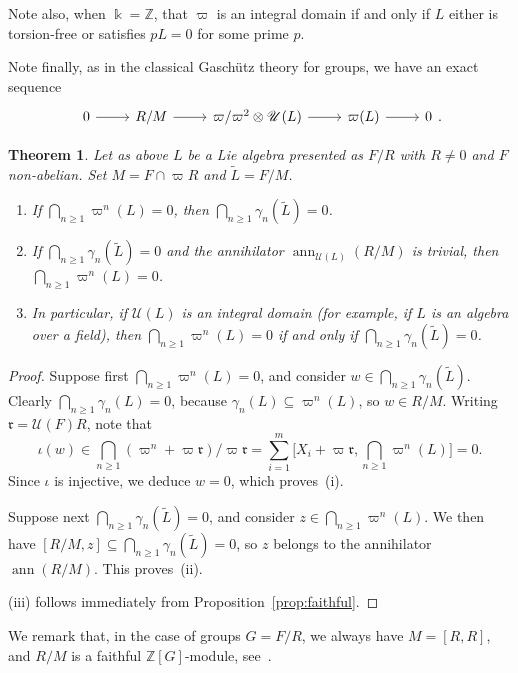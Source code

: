 \documentclass[a4paper,reqno,notitlepage]{amsart}
\newtheorem{theorem}{Theorem}[section]
\theoremstyle{definition}
\newcommand{\Z}{\mathbb Z}
\newcommand\rr{{\mathfrak r}}
\newcommand\U{\mathscr U}
\begin{document}
Note also, when $\Bbbk=\Z$, that $\varpi$ is an integral domain if and
only if $L$ either is torsion-free or satisfies $pL=0$ for some prime
$p$.

Note finally, as in the classical Gasch\"utz theory for groups, we
have an exact sequence
\[\begin{tikzcd}0\arrow{r} & R/M\arrow{r} & \varpi/\varpi^2\otimes\U(L)\arrow{r} & \varpi(L)\arrow{r} & 0\end{tikzcd}.
\]

\newcommand\ann{\operatorname{ann}}

\begin{theorem}
  Let as above $L$ be a Lie algebra presented as $F/R$ with $R\neq0$
  and $F$ non-abelian. Set $M=F\cap\varpi R$ and $\widetilde
  L=F/M$.
  \begin{enumerate}
  \item[(i)] If $\bigcap_{n\ge1}\varpi^n(L)=0$, then
    $\bigcap_{n\ge1}\gamma_n(\widetilde L)=0$.
  \item[(ii)] If $\bigcap_{n\ge1}\gamma_n(\widetilde L)=0$ and the
    annihilator $\ann_{\U(L)}(R/M)$ is trivial, then
    $\bigcap_{n\ge1}\varpi^n(L)=0$.
  \item[(iii)] In particular, if $\U(L)$ is an integral domain (for
    example, if $L$ is an algebra over a field), then
    $\bigcap_{n\ge1}\varpi^n(L)=0$ if and only if
    $\bigcap_{n\ge1}\gamma_n(\widetilde L)=0$.
  \end{enumerate}
\end{theorem}
\begin{proof}
  Suppose first $\bigcap_{n\ge1}\varpi^n(L)=0$, and consider
  $w\in\bigcap_{n\ge1}\gamma_n(\widetilde L)$. Clearly
  $\bigcap_{n\ge1}\gamma_n(L)=0$, because
  $\gamma_n(L)\subseteq\varpi^n(L)$, so $w\in R/M$. Writing
  $\rr=\U(F)R$, note that
  \[\iota(w)\in\bigcap_{n\ge1}(\varpi^n+\varpi\rr)/\varpi\rr=\sum_{i=1}^m\big[X_i+\varpi\rr,\bigcap_{n\ge1}\varpi^n(L)\big]=0.\]
  Since $\iota$ is injective, we deduce $w=0$, which proves~(i).

  Suppose next $\bigcap_{n\ge1}\gamma_n(\widetilde L)=0$, and consider
  $z\in\bigcap_{n\ge1}\varpi^n(L)$. We then have
  $[R/M,z]\subseteq\bigcap_{n\ge1}\gamma_n(\widetilde L)=0$, so $z$ belongs
  to the annihilator $\ann(R/M)$. This proves~(ii).

  (iii) follows immediately from Proposition~\ref{prop:faithful}.
\end{proof}

We remark that, in the case of groups $G=F/R$, we always have
$M=[R,R]$, and $R/M$ is a faithful $\Z[G]$-module,
see~\cite{Passi:75}.
\end{document}
